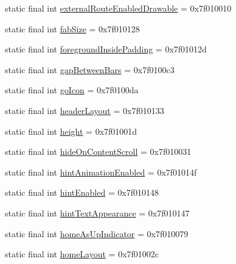 \begin{CompactItemize}
\item 
static final int \hyperlink{classandroid_1_1support_1_1graphics_1_1drawable_1_1_r_1_1attr_d18b6b743056332d2f88648909593f36}{externalRouteEnabledDrawable} = 0x7f010010
\item 
static final int \hyperlink{classandroid_1_1support_1_1graphics_1_1drawable_1_1_r_1_1attr_adfec0f656aeb7c0b981927269896dfb}{fabSize} = 0x7f010128
\item 
static final int \hyperlink{classandroid_1_1support_1_1graphics_1_1drawable_1_1_r_1_1attr_cb3465d177569910532d43b75eb6632c}{foregroundInsidePadding} = 0x7f01012d
\item 
static final int \hyperlink{classandroid_1_1support_1_1graphics_1_1drawable_1_1_r_1_1attr_8606654add7aaa51b6b773d653bb5267}{gapBetweenBars} = 0x7f0100c3
\item 
static final int \hyperlink{classandroid_1_1support_1_1graphics_1_1drawable_1_1_r_1_1attr_6b8bce65c848773ffceee7bdddbdab2b}{goIcon} = 0x7f0100da
\item 
static final int \hyperlink{classandroid_1_1support_1_1graphics_1_1drawable_1_1_r_1_1attr_d0aea555f6e57a18549ae617e49aab9e}{headerLayout} = 0x7f010133
\item 
static final int \hyperlink{classandroid_1_1support_1_1graphics_1_1drawable_1_1_r_1_1attr_dbe16cb5947f046b1b1842e0710db5e0}{height} = 0x7f01001d
\item 
static final int \hyperlink{classandroid_1_1support_1_1graphics_1_1drawable_1_1_r_1_1attr_dde553648d872a91e7b9d3447bd7a997}{hideOnContentScroll} = 0x7f010031
\item 
static final int \hyperlink{classandroid_1_1support_1_1graphics_1_1drawable_1_1_r_1_1attr_6fc42993be46615f85cb36ec0efdc98e}{hintAnimationEnabled} = 0x7f01014f
\item 
static final int \hyperlink{classandroid_1_1support_1_1graphics_1_1drawable_1_1_r_1_1attr_471a77c82a731adadc0e8937f66f6f88}{hintEnabled} = 0x7f010148
\item 
static final int \hyperlink{classandroid_1_1support_1_1graphics_1_1drawable_1_1_r_1_1attr_edce01b269b72f97c586b3fa6b439d87}{hintTextAppearance} = 0x7f010147
\item 
static final int \hyperlink{classandroid_1_1support_1_1graphics_1_1drawable_1_1_r_1_1attr_44c266e4dc49ebe1c976cd67cede1a62}{homeAsUpIndicator} = 0x7f010079
\item 
static final int \hyperlink{classandroid_1_1support_1_1graphics_1_1drawable_1_1_r_1_1attr_a200d94128dc235bd51e497a5129b576}{homeLayout} = 0x7f01002c

\end{CompactItemize}
